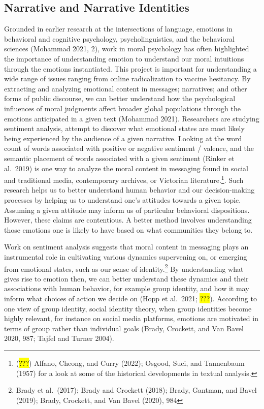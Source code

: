 \documentclass[
  letterpaper,
  DIV=11,
  numbers=noendperiod]{scrartcl}
\theoremstyle{remark}
\begin{document}
\subsection{Narrative and Narrative
Identities}\label{narrative-and-narrative-identities}

Grounded in earlier research at the intersections of language, emotions
in behavioral and cognitive psychology, psycholinguistics, and the
behavioral sciences (Mohammad 2021, 2), work in moral psychology has
often highlighted the importance of understanding emotion to understand
our moral intuitions through the emotions instantiated. This project is
important for understanding a wide range of issues ranging from online
radicalization to vaccine hesitancy. By extracting and analyzing
emotional content in messages; narratives; and other forms of public
discourse, we can better understand how the psychological influences of
moral judgments affect broader global populations through the emotions
anticipated in a given text (Mohammad 2021). Researchers are studying
sentiment analysis, attempt to discover what emotional states are most
likely being experienced by the audience of a given narrative. Looking
at the word count of words associated with positive or negative
sentiment / valence, and the semantic placement of words associated with
a given sentiment (Rinker et al.~2019) is one way to analyze the moral
content in messaging found in social and traditional media, contemporary
archives, or Victorian literature.\footnote{(\hl{???}) Alfano, Cheong,
  and Curry (2022); Osgood, Suci, and Tannenbaum (1957) for a look at
  some of the historical developments in textual analysis.}. Such
research helps us to better understand human behavior and our
decision-making processes by helping us to understand one's attitudes
towards a given topic. Assuming a given attitude may inform us of
particular behavioral dispositions. However, these claims are
contentious. A better method involves understanding those emotions one
is likely to have based on what communities they belong to.

Work on sentiment analysis suggests that moral content in messaging
plays an instrumental role in cultivating various dynamics supervening
on, or emerging from emotional states, such as our sense of
identity.\footnote{Brady et al.~(2017); Brady and Crockett (2018);
  Brady, Gantman, and Bavel (2019); Brady, Crockett, and Van Bavel
  (2020), 984} By understanding what gives rise to emotion then, we can
better understand these dynamics and their associations with human
behavior, for example group identity, and how it may inform what choices
of action we decide on (Hopp et al.~2021; \hl{???}). According to one
view of group identity, social identity theory, when group identities
become highly relevant, for instance on social media platforms, emotions
are motivated in terms of group rather than individual goals (Brady,
Crockett, and Van Bavel 2020, 987; Tajfel and Turner 2004).
\end{document}

